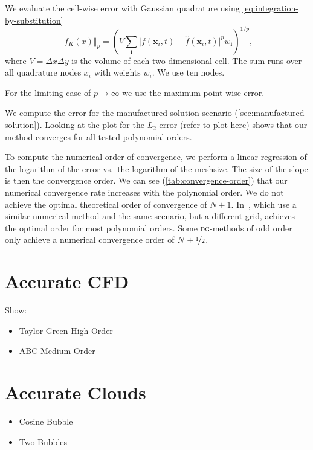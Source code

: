 We evaluate the cell-wise error with Gaussian quadrature using \cref{eq:integration-by-substitution}
 \begin{equation}
   \Vert f_K(x) \Vert_p = \left( V \sum_{\bm{i}} \vert f(\bm{x}_i, t) - \hat{f}(\bm{x}_i, t) \vert^p w_{{\bm{i}}}  \right)^{1/p},
 \end{equation}
where $V = \Delta x \Delta y$ is the volume of each two-dimensional cell.
The sum runs over all quadrature nodes $x_i$ with weights $w_i$.
We use ten nodes.

For the limiting case of $p \to \infty$ we use the maximum point-wise error.


We compute the error for the manufactured-solution scenario (\cref{sec:manufactured-solution}).
Looking at the plot for the $L_2$ error (refer to plot here) shows that our method converges for all tested polynomial orders.

To compute the numerical order of convergence, we perform a linear regression of the logarithm of the error vs.\ the logarithm of the meshsize.
The size of the slope is then the convergence order.
We can see (\cref{tab:convergence-order}) that our numerical convergence rate increases with the polynomial order.
We do not achieve the optimal theoretical order of convergence of $N+1$.
In~\cite{dumbser2010arbitrary}, which use a similar numerical method and the same scenario, but a different grid, \citeauthor{dumbser2010arbitrary} achieves the optimal order for most polynomial orders.
Some \textsc{dg}-methods of odd order only achieve a numerical convergence order of $N+\nicefrac{1}{2}$.

\section{Accurate CFD}
Show:
\begin{itemize}
\item Taylor-Green High Order
\item ABC Medium Order
\end{itemize}
\section{Accurate Clouds}
\begin{itemize}
\item Cosine Bubble
\item Two Bubbles
\end{itemize}
